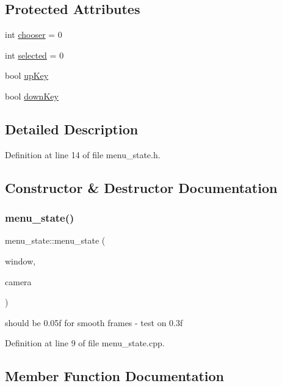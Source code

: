 \subsection*{Protected Attributes}
\begin{DoxyCompactItemize}
\item 
int \hyperlink{classmenu__state_ad2cb1aba8756c2755fac3b46a4a9bd4e}{chooser} = 0
\item 
int \hyperlink{classmenu__state_a256be5c2a9daab653607841f6b990599}{selected} = 0
\item 
bool \hyperlink{classmenu__state_adb6204412ee77221d8bec5b407f71f0f}{up\+Key}
\item 
bool \hyperlink{classmenu__state_a37458b8737ec94f051de97d8e3b00c37}{down\+Key}
\end{DoxyCompactItemize}


\subsection{Detailed Description}


Definition at line 14 of file menu\+\_\+state.\+h.



\subsection{Constructor \& Destructor Documentation}
\hypertarget{classmenu__state_a9b46b08734b75faa23cc44475a899679}{}\label{classmenu__state_a9b46b08734b75faa23cc44475a899679} 
\subsubsection{\texorpdfstring{menu\+\_\+state()}{menu\_state()}}
{\footnotesize\ttfamily menu\+\_\+state\+::menu\+\_\+state (\begin{DoxyParamCaption}\item[{sf\+::\+Render\+Window \&}]{window,  }\item[{sf\+::\+View \&}]{camera }\end{DoxyParamCaption})}

should be 0.\+05f for smooth frames -\/ test on 0.\+3f 

Definition at line 9 of file menu\+\_\+state.\+cpp.



\subsection{Member Function Documentation}
\hypertarget{classmenu__state_a94de13d24de8872cd8819e6beaba0a4d}{}\label{classmenu__state_a94de13d24de8872cd8819e6beaba0a4d} 
